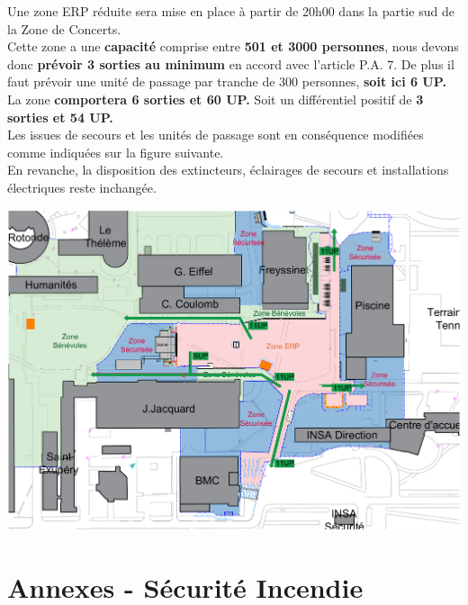 \documentclass[hidelinks, paper=a4, fontsize=13pt]{report}
\begin{document}
Une zone ERP réduite sera mise en place à partir de 20h00 dans la partie sud de la Zone de Concerts.\\

Cette zone a une \textbf{capacité} comprise entre \textbf{501 et 3000 personnes}, nous devons donc \textbf{prévoir 3 sorties au minimum} en accord avec l’article P.A. 7. De plus il faut prévoir une unité de passage par tranche de 300 personnes, \textbf{soit ici 6 UP.}\\

La zone \textbf{comportera 6 sorties et 60 UP.} Soit un différentiel positif de \textbf{3 sorties et 54 UP.}\\
					
Les issues de secours et les unités de passage sont en conséquence modifiées comme indiquées sur la figure suivante.\\

En revanche, la disposition des extincteurs, éclairages de secours et installations électriques reste inchangée.\\

\begin{center}
\includegraphics[width=\textwidth,keepaspectratio, angle=90]{Exports/Plan_24h_44eme-Dimanche_IS}
\end{center}

\newpage

\section{Annexes - Sécurité Incendie}
\end{document}
